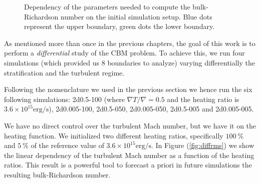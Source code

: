 \begin{figure}[t!]
  \centering
      \hfill
	\hfill
	\caption{Dependency of the parameters needed to compute the bulk-Richardson number on the initial simulation setup. Blue dots represent the upper boundary, green dots the lower boundary.}
	\label{fig:diffparam}
\end{figure}
As mentioned more than once in the previous chapters, the goal of this work is to perform a \textit{differential} study of the CBM problem. To achieve this, we run four simulations (which provided us 8 boundaries to analyze) varying differentially the stratification and the turbulent regime. 

Following the nomenclature we used in the previous section we hence run the six following simulations: 2d0.5-100 (where $\nabla T / \nabla = 0.5$ and the heating ratio is  $3.6 \times 10^{15} \mathrm{erg/s}$), 2d0.005-100, 2d0.5-050, 2d0.005-050, 2d0.5-005 and 2d0.005-005.

We have no direct control over the turbulent Mach number, but we have it on the heating function. We initialized two different heating ratios, specifically $100 \ \%$ and $5 \ \%$ of the reference value of $3.6 \times 10^{15} \mathrm{erg/s}$. In Figure (\ref{fig:diffrms}) we show the linear dependency of the turbulent Mach number as a function of the heating ratios. This result is a powerful tool to forecast a priori in future simulations the resulting bulk-Richardson number.

